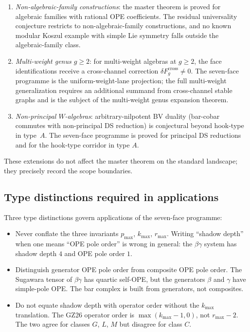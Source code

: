\documentclass[11pt]{article}
\theoremstyle{plain}
\theoremstyle{definition}
\theoremstyle{remark}
\begin{document}
\begin{enumerate}
 \item \emph{Non-algebraic-family constructions}\/: the master
 theorem is proved for algebraic families with rational OPE
 coefficients. The residual universality conjecture
 restricts to non-algebraic-family constructions, and no known
 modular Koszul example with simple Lie symmetry falls outside
 the algebraic-family class.
 \item \emph{Multi-weight genus $g\geq 2$}\/: for multi-weight
 algebras at $g\geq 2$, the face identifications receive a
 cross-channel correction $\delta F_g^{\mathrm{cross}}\neq 0$.
 The seven-face programme is the uniform-weight-lane projection;
 the
 full multi-weight generalization requires an additional
 summand from cross-channel stable graphs and is the subject
 of the multi-weight genus expansion theorem.
 \item \emph{Non-principal $W$-algebras}\/: arbitrary-nilpotent
 BV duality (bar-cobar commutes with non-principal DS
 reduction) is conjectural beyond hook-type in type~$A$. The
 seven-face programme is proved for principal DS reductions
 and for the hook-type corridor in type $A$.
\end{enumerate}

These extensions do not affect the master theorem on the standard
landscape; they precisely record the scope boundaries.

\subsection{Type distinctions required in applications}

Three type distinctions govern applications of the seven-face programme:

\begin{itemize}
 \item Never conflate the three invariants
 $p_{\max}$, $k_{\max}$, $r_{\max}$. Writing ``shadow depth''
 when one means ``OPE pole order'' is wrong in general: the
 $\beta\gamma$ system has shadow depth $4$ and OPE pole
 order $1$.
 \item Distinguish generator OPE pole order
 from composite OPE pole order. The Sugawara tensor of
 $\beta\gamma$ has quartic self-OPE, but the generators
 $\beta$ and $\gamma$ have simple-pole OPE. The bar complex
 is built from generators, not composites.
 \item Do not equate shadow depth with operator
 order without the $k_{\max}$ translation. The GZ26 operator
 order is $\max(k_{\max}-1,0)$, not $r_{\max}-2$. The two
 agree for classes $G$, $L$, $M$ but disagree for class $C$.
\end{itemize}
\end{document}

